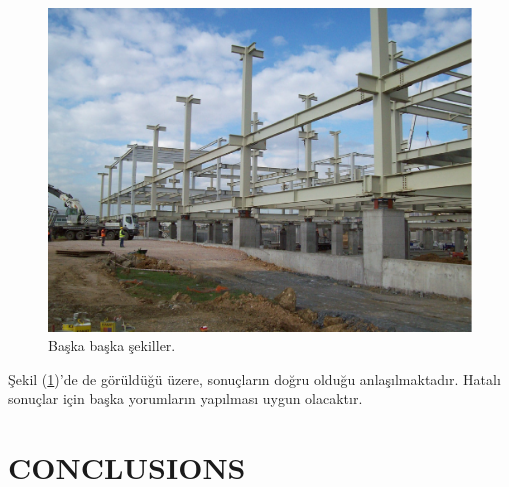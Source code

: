 \documentclass[english]{eqengconf}
\begin{document}
\begin{figure}[h]
	\centering
	\includegraphics[scale=0.4]{b.PNG}
	\caption{\label{fig:ikinciyapi} Başka başka şekiller.}
	\vspace{-5pt}
\end{figure}

Şekil (\ref{fig:ikinciyapi})'de de görüldüğü üzere, sonuçların doğru olduğu anlaşılmaktadır. Hatalı sonuçlar için başka yorumların yapılması uygun olacaktır.

\blindtext

\section{CONCLUSIONS}
\blindtext

\blindtext

\printbibliography
\end{document}
